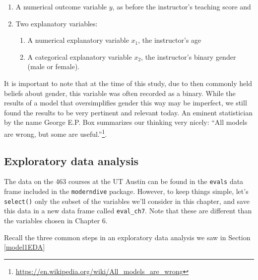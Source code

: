 \documentclass[12pt, krantz2,]{krantz}
\makeatletter
\newenvironment{Shaded}{\begin{snugshade}}{\end{snugshade}}
\newcommand{\KeywordTok}[1]{\textcolor[rgb]{0.27,0.27,0.27}{\textbf{#1}}}
\newcommand{\NormalTok}[1]{#1}
\newcommand{\OperatorTok}[1]{\textcolor[rgb]{0.43,0.43,0.43}{\textbf{#1}}}
\newcommand{\StringTok}[1]{\textcolor[rgb]{0.5,0.5,0.5}{#1}}
\providecommand{\tightlist}{%
  \setlength{\itemsep}{0pt}\setlength{\parskip}{0pt}}
\renewcommand{\href}[2]{#2\footnote{\url{#1}}}
\newenvironment{kframe}{%
\medskip{}
\setlength{\fboxsep}{.8em}
 \def\at@end@of@kframe{}%
 \ifinner\ifhmode%
  \def\at@end@of@kframe{\end{minipage}}%
  \begin{minipage}{\columnwidth}%
 \fi\fi%
 \def\FrameCommand##1{\hskip\@totalleftmargin \hskip-\fboxsep
 \colorbox{shadecolor}{##1}\hskip-\fboxsep
     \hskip-\linewidth \hskip-\@totalleftmargin \hskip\columnwidth}%
 \MakeFramed {\advance\hsize-\width
   \@totalleftmargin\z@ \linewidth\hsize
   \@setminipage}}%
 {\par\unskip\endMakeFramed%
 \at@end@of@kframe}
\renewenvironment{Shaded}{\begin{kframe}}{\end{kframe}}
\makeatother
\begin{document}
\begin{enumerate}
\def\labelenumi{\arabic{enumi}.}
\tightlist
\item
  A numerical outcome variable \(y\), as before the instructor's teaching score and
\item
  Two explanatory variables:

  \begin{enumerate}
  \def\labelenumii{\arabic{enumii}.}
  \tightlist
  \item
    A numerical explanatory variable \(x_1\), the instructor's age
  \item
    A categorical explanatory variable \(x_2\), the instructor's binary gender (male or female).
  \end{enumerate}
\end{enumerate}

It is important to note that at the time of this study, due to then commonly held beliefs about gender, this variable was often recorded as a binary. While the results of a model that oversimplifies gender this way may be imperfect, we still found the results to be very pertinent and relevant today. An eminent statistician by the name George E.P. Box summarizes our thinking very nicely: \href{https://en.wikipedia.org/wiki/All_models_are_wrong}{``All models are wrong, but some are useful.''}.

\hypertarget{model4EDA}{%
\subsection{Exploratory data analysis}\label{model4EDA}}

The data on the 463 courses at the UT Austin can be found in the \texttt{evals} data frame included in the \texttt{moderndive} package. However, to keep things simple, let's \texttt{select()} only the subset of the variables we'll consider in this chapter, and save this data in a new data frame called \texttt{eval\_ch7}. Note that these are different than the variables chosen in Chapter 6.

\begin{Shaded}
\end{Shaded}

Recall the three common steps in an exploratory data analysis we saw in Section \ref{model1EDA}
\end{document}
